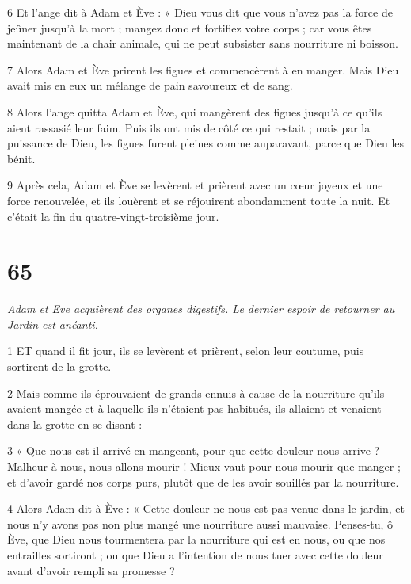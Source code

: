 \par 6 Et l'ange dit à Adam et Ève : « Dieu vous dit que vous n'avez pas la force de jeûner jusqu'à la mort ; mangez donc et fortifiez votre corps ; car vous êtes maintenant de la chair animale, qui ne peut subsister sans nourriture ni boisson.

\par 7 Alors Adam et Ève prirent les figues et commencèrent à en manger. Mais Dieu avait mis en eux un mélange de pain savoureux et de sang.

\par 8 Alors l'ange quitta Adam et Ève, qui mangèrent des figues jusqu'à ce qu'ils aient rassasié leur faim. Puis ils ont mis de côté ce qui restait ; mais par la puissance de Dieu, les figues furent pleines comme auparavant, parce que Dieu les bénit.

\par 9 Après cela, Adam et Ève se levèrent et prièrent avec un cœur joyeux et une force renouvelée, et ils louèrent et se réjouirent abondamment toute la nuit. Et c'était la fin du quatre-vingt-troisième jour.

\chapter{65}

\par \textit{Adam et Eve acquièrent des organes digestifs. Le dernier espoir de retourner au Jardin est anéanti.}

\par 1 ET quand il fit jour, ils se levèrent et prièrent, selon leur coutume, puis sortirent de la grotte.

\par 2 Mais comme ils éprouvaient de grands ennuis à cause de la nourriture qu'ils avaient mangée et à laquelle ils n'étaient pas habitués, ils allaient et venaient dans la grotte en se disant :

\par 3 « Que nous est-il arrivé en mangeant, pour que cette douleur nous arrive ? Malheur à nous, nous allons mourir ! Mieux vaut pour nous mourir que manger ; et d'avoir gardé nos corps purs, plutôt que de les avoir souillés par la nourriture.

\par 4 Alors Adam dit à Ève : « Cette douleur ne nous est pas venue dans le jardin, et nous n'y avons pas non plus mangé une nourriture aussi mauvaise. Penses-tu, ô Ève, que Dieu nous tourmentera par la nourriture qui est en nous, ou que nos entrailles sortiront ; ou que Dieu a l’intention de nous tuer avec cette douleur avant d’avoir rempli sa promesse ?

